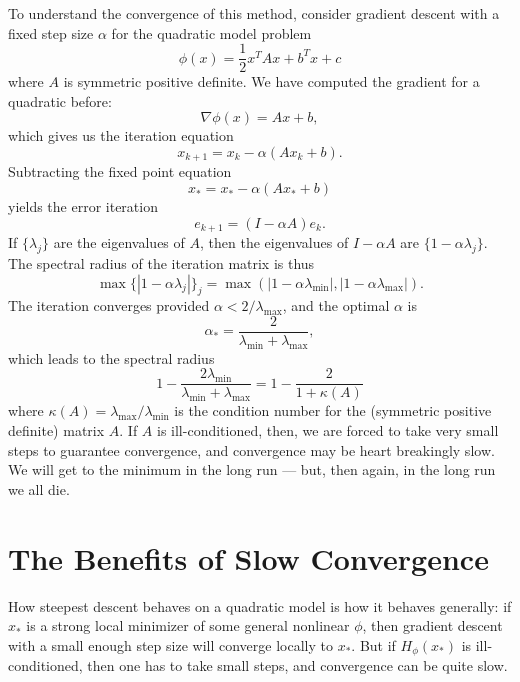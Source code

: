 \documentclass[12pt, leqno]{article} %
\begin{document}
To understand the convergence of this method, consider gradient
descent with a fixed step size $\alpha$ for the quadratic model problem
\[
  \phi(x) = \frac{1}{2} x^T A x + b^T x + c
\]
where $A$ is symmetric positive definite.  
We have computed the gradient for a quadratic before:
\[
  \nabla \phi(x) = Ax + b,
\]
which gives us the iteration equation
\[
  x_{k+1} = x_k - \alpha (A x_k + b).
\]
Subtracting the fixed point equation
\[
  x_* = x_* - \alpha (A x_* + b)
\]
yields the error iteration
\[
  e_{k+1} = (I-\alpha A) e_k.
\]
If $\{ \lambda_j \}$ are the eigenvalues of $A$, then the
eigenvalues of $I-\alpha A$ are $\{ 1-\alpha \lambda_j \}$.
The spectral radius of the iteration matrix is thus
\[
  \max \{ |1-\alpha \lambda_j| \}_j =
  \max \left( |1-\alpha \lambda_{\min}|, |1-\alpha \lambda_{\max}| \right).
\]
The iteration converges provided $\alpha < 2/\lambda_{\max}$, and the
optimal $\alpha$ is
\[
  \alpha_* = \frac{2}{\lambda_{\min} + \lambda_{\max}},
\]
which leads to the spectral radius
\[
  1 - \frac{2 \lambda_{\min}}{\lambda_{\min} + \lambda_{\max}} =
  1 - \frac{2}{1 + \kappa(A)}
\]
where $\kappa(A) = \lambda_{\max}/\lambda_{\min}$ is the condition
number for the (symmetric positive definite) matrix $A$.  If $A$
is ill-conditioned, then, we are forced to take very small steps
to guarantee convergence, and convergence may be
heart breakingly slow.  We will get to the minimum in the long run
--- but, then again, in the long run we all die.

\section{The Benefits of Slow Convergence}

How steepest descent behaves on a quadratic model
is how it behaves generally: if $x_*$ is a
strong local minimizer of some general nonlinear $\phi$, then gradient
descent with a small enough step size will converge locally to
$x_*$.  But if $H_{\phi}(x_*)$ is ill-conditioned, then one has to
take small steps, and convergence can be quite slow.
\end{document}
